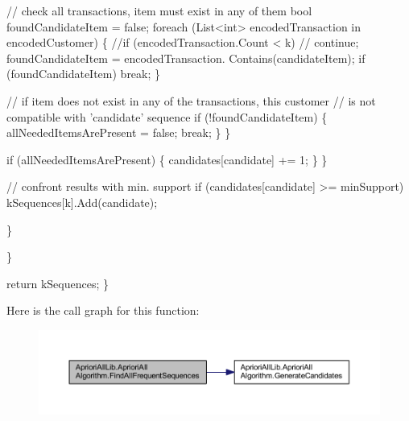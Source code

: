 \begin{DoxyCode}
                            \textcolor{comment}{// check all transactions, item must exist in any
       of them}
                            \textcolor{keywordtype}{bool} foundCandidateItem = \textcolor{keyword}{false};
                            \textcolor{keywordflow}{foreach} (List<int> encodedTransaction \textcolor{keywordflow}{in} 
      encodedCustomer) \{
                                \textcolor{comment}{//if (encodedTransaction.Count < k)}
                                \textcolor{comment}{//  continue;}
                                foundCandidateItem = encodedTransaction.
      Contains(candidateItem);
                                \textcolor{keywordflow}{if} (foundCandidateItem)
                                    \textcolor{keywordflow}{break};
                            \}

                            \textcolor{comment}{// if item does not exist in any of the
       transactions, this customer}
                            \textcolor{comment}{// is not compatible with 'candidate' sequence}
                            \textcolor{keywordflow}{if} (!foundCandidateItem) \{
                                allNeededItemsArePresent = \textcolor{keyword}{false};
                                \textcolor{keywordflow}{break};
                            \}
                        \}

                        \textcolor{keywordflow}{if} (allNeededItemsArePresent) \{
                            candidates[candidate] += 1;
                        \}
                    \}

                    \textcolor{comment}{// confront results with min. support}
                    \textcolor{keywordflow}{if} (candidates[candidate] >= minSupport)
                        kSequences[k].Add(candidate);

                \}

            \}

            \textcolor{keywordflow}{return} kSequences;
        \}
\end{DoxyCode}


Here is the call graph for this function\-:
\nopagebreak
\begin{figure}[H]
\begin{center}
\leavevmode
\includegraphics[width=350pt]{class_apriori_all_lib_1_1_apriori_all_algorithm_ae57be8bc7c5996b4687db96e333acc6a_cgraph}
\end{center}
\end{figure}




